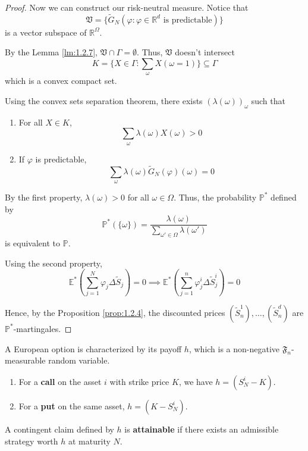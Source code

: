 \begin{proof}
    Now we can construct our risk-neutral measure. Notice that 
    \[
        \mathfrak{V} = \{ \tilde{G}_N(\varphi : \varphi \in \mathbb{R}^d \text{ is predictable})\}
    \]
    is a vector subspace of $\mathbb{R}^\Omega$.

    By the Lemma \ref{lm:1.2.7}, $\mathfrak{V} \cap \Gamma = \emptyset$. Thus, $\mathfrak{V}$ doesn't intersect 
    \[
        K = \{X \in \Gamma : \sum_\omega X(\omega = 1) \} \subseteq \Gamma
    \]
    which is a convex compact set. 

    Using the convex sets separation theorem, there exists $(\lambda(\omega))_\omega$ such that 
    \begin{enumerate}
        \item For all $X \in K$, 
        \[
            \sum_\omega \lambda(\omega) X(\omega) > 0
        \]
        \item If $\varphi$ is predictable, 
        \[
            \sum_\omega \lambda(\omega) \tilde{G}_N(\varphi)(\omega) = 0
        \]
    \end{enumerate}

    By the first property, $\lambda(\omega) > 0$ for all $\omega \in \Omega$. Thus, the probability $\mathbb{P}^\ast$ defined by 
    \[
        \mathbb{P}^\ast(\{ \omega \}) = \frac{\lambda(\omega)}{\sum_{\omega' \in \Omega} \lambda(\omega')}
    \]
    is equivalent to $\mathbb{P}$.

    Using the second property, 
    \[
        \mathbb{E}^\ast \left( \sum_{j=1}^{N} \varphi_j \Delta \tilde{S}_j \right) = 0 \implies \mathbb{E}^\ast \left( \sum_{j=1}^{n} \varphi_j^i \Delta \tilde{S}_j^i \right) = 0
    \]

    Hence, by the Proposition \ref{prop:1.2.4}, the discounted prices $(\tilde{S}_n^1), \ldots, (\tilde{S}_n^d)$ are $\mathbb{P}^\ast$-martingales.
\end{proof}

A European option is characterized by its payoff $h$, which is a non-negative $\mathfrak{F}_n$-measurable random variable.
\begin{enumerate}
    \item For a \textbf{call} on the asset $i$ with strike price $K$, we have $h = (S_N^i - K)$.
    \item For a \textbf{put} on the same asset, $h = (K - S_N^i)$.
\end{enumerate}

\begin{definition}
    A contingent claim defined by $h$ is \textbf{attainable} if there exists an admissible strategy worth $h$ at maturity $N$.
\end{definition}

